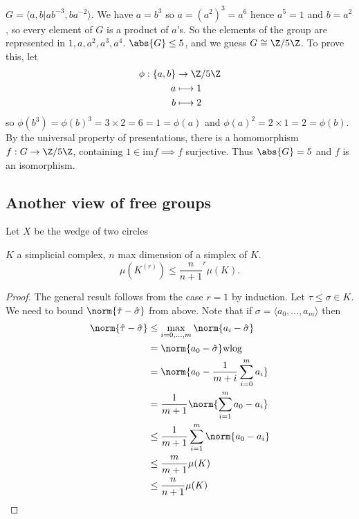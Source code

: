 \documentclass{article}
\numberwithin{nthm}{subsection}
\begin{document}
\begin{eg}
    $G = \langle a, b | a b^{-3}, b a^{-2} \rangle$.
    We have $a = b^3$ so $a = (a^2)^3 = a^6$ hence $a^5 = 1$ and $b = a^2$, so every element of $G$ is a product of $a$'s.
    So the elements of the group are represented in $1, a, a^2, a^3, a^4$.
    $\abs{G} \leq 5$, and we guess $G \cong \Z/5\Z$. To prove this, let
    \begin{align*}
        \phi:\{a, b\} &\rightarrow \Z/5\Z \\
        a &\longmapsto 1 \\
        b &\longmapsto 2 \\
    \end{align*}
    so $\phi(b^3) = \phi(b)^3 = 3 \times 2 = 6 = 1 = \phi(a)$ and $\phi(a)^2 = 2 \times 1 = 2 = \phi(b)$.
    By the universal property of presentations, there is a homomorphism $f: G \to \Z/5\Z$, containing $1 \in \mathrm{im} f \implies f$ surjective. Thus $\abs{G} = 5$ and $f$ is an isomorphism.
\end{eg}

\subsection{Another view of free groups}

\begin{eg}
    Let $X$ be the wedge of two circles
\end{eg}


\begin{lemma}
    $K$ a simplicial complex, $n$ max dimension of a simplex of $K$.
    \begin{equation*}
        \mu(K^{(r)}) \leq \frac{n}{n+1}^r \mu(K).
    \end{equation*}
\end{lemma}

\begin{proof}
    The general result follows from the case $r=1$ by induction.
    Let $\tau \leq \sigma \in K$. We need to bound $\norm{\hat{\tau} - \hat{\sigma}}$ from above. Note that if $\sigma = \langle a_0, \dotsc, a_m \rangle$ then
    \begin{align*}
        \norm{\hat{\tau} - \hat{\sigma}} &\leq \max_{i=0, \dotsc, m} \norm{a_i - \hat{\sigma}} \\
                                         &= \norm{a_0 - \hat{\sigma}} \text{wlog} \\
                                         &= \norm{a_0 - \frac{1}{m+i} \sum_{i=0}^m a_i} \\
                                         &= \frac{1}{m+1} \norm{\sum_{i=1}^m a_0 - a_i} \\
                                         &\leq \frac{1}{m+1} \sum_{i=1}^m \norm{a_0 - a_i}  \\
                                         &\leq \frac{m}{m+1} \mu(K) \\
                                         &\leq \frac{n}{n+1} \mu(K) \qedhere
    \end{align*}
\end{proof}
\end{document}
